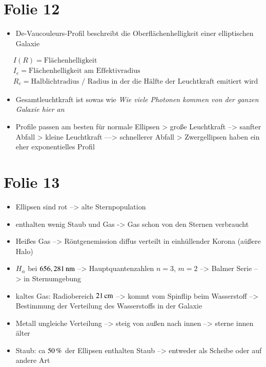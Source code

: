 \section{Folie 12}

\begin{itemize}
\item De-Vaucouleurs-Profil beschreibt die Oberflächenhelligkeit einer elliptischen Galaxie
\end{itemize}

\begin{align*}
&I(R) = \text{Flächenhelligkeit} \\
&I_e = \text{Flächenhelligkeit am Effektivradius} \\
&R_e = \text{Halblichtradius / Radius in der die Hälfte der Leuchtkraft emitiert wird}
\end{align*}


\begin{itemize}
\item Gesamtleuchtkraft ist sowas wie \textit{Wie viele Photonen kommen von der ganzen Galaxie hier an}
\item Profile passen am besten für normale Ellipsen
\subitem > große Leuchtkraft --> sanfter Abfall
\subitem > kleine Leuchtkraft ---> schnellerer Abfall
\subitem > Zwergellipsen haben ein eher exponentielles Profil
\end{itemize}


\section{Folie 13}

\begin{itemize}
\item Ellipsen sind rot --> alte Sternpopulation
\item enthalten wenig Staub und Gas -> Gas schon von den Sternen verbraucht
\item Heißes Gas --> Röntgenemission diffus verteilt in einhüllender Korona (aüßere Halo)
\item $H_\alpha$ bei $\unit[656,281]{nm}$ -->  Hauptquantenzahlen $n=3$, $m=2$ --> Balmer Serie --> in Sternumgebung
\item kaltes Gas: Radiobereich $\unit[21]{cm}$ --> kommt vom Spinflip beim Wasserstoff --> Bestimmung der Verteilung des Wasserstoffs in der Galaxie
\item Metall ungleiche Verteilung --> steig von außen nach innen --> sterne innen älter
\item Staub: ca $\unit[50]{\%}$ der Ellipsen enthalten Staub --> entweder als Scheibe oder auf andere Art
\end{itemize}


